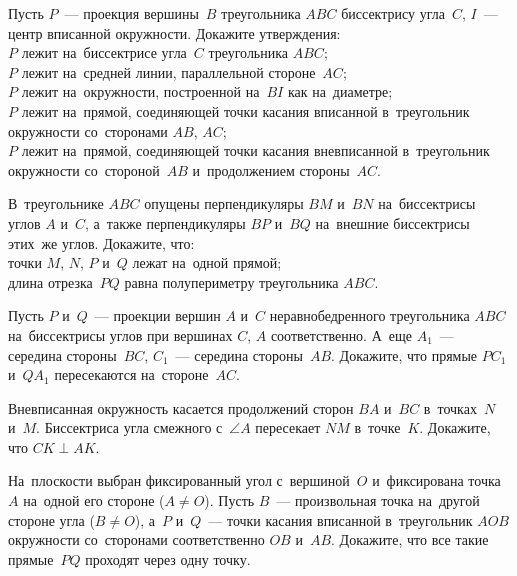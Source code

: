 


\begin{problems}

\item
Пусть $P$~--- проекция вершины~$B$ треугольника $ABC$ биссектрису угла~$C$,
$I$~--- центр вписанной окружности.
Докажите утверждения:
\\
\subproblem
$P$ лежит на~биссектрисе угла~$C$ треугольника $ABC$;
\\
\subproblem
$P$ лежит на~средней линии, параллельной стороне~$AC$;
\\
\subproblem
$P$ лежит на~окружности, построенной на~$BI$ как на~диаметре;
\\
\subproblem
$P$ лежит на~прямой, соединяющей точки касания вписанной в~треугольник
окружности со~сторонами $AB$, $AC$;
\\
\subproblem
$P$ лежит на~прямой, соединяющей точки касания вневписанной в~треугольник
окружности со~стороной~$AB$ и~продолжением стороны~$AC$.

\item
В~треугольнике $ABC$ опущены перпендикуляры $BM$ и~$BN$ на~биссектрисы углов
$A$ и~$C$, а~также перпендикуляры $BP$ и~$BQ$ на~внешние биссектрисы этих~же
углов.
Докажите, что:
\\
\subproblem
точки $M$, $N$, $P$ и~$Q$ лежат на~одной прямой;
\\
\subproblem
длина отрезка~$PQ$ равна полупериметру треугольника $ABC$.

\item
Пусть $P$ и~$Q$~--- проекции вершин $A$ и~$C$ неравнобедренного
треугольника $ABC$ на~биссектрисы углов при вершинах $C$, $A$ соответственно.
А~еще $A_{1}$~--- середина стороны~$BC$, $C_{1}$~--- середина стороны~$AB$.
Докажите, что прямые $PC_{1}$ и~$QA_{1}$ пересекаются на~стороне~$AC$.

\item
Вневписанная окружность касается продолжений сторон $BA$ и~$BC$
в~точках~$N$ и~$M$.
Биссектриса угла смежного с~$\angle A$ пересекает $NM$ в~точке~$K$.
Докажите, что $CK \perp AK$.

\item
На~плоскости выбран фиксированный угол с~вершиной~$O$ и~фиксирована точка~$A$
на~одной его стороне ($A \neq O$).
Пусть $B$~--- произвольная точка на~другой стороне угла ($B \neq O$),
а~$P$ и~$Q$~--- точки касания вписанной в~треугольник $AOB$ окружности
со~сторонами соответственно $OB$ и~$AB$.
Докажите, что все такие прямые~$PQ$ проходят через одну точку.


\end{problems}
